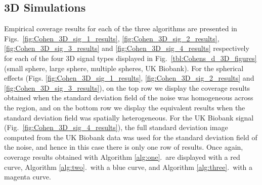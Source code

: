 \clearpage

\subsection{3D Simulations} 
\label{sec:3d_sim_results}
Empirical coverage results for each of the three algorithms are presented in Figs.\ \ref{fig:Cohen_3D_sig_1_results}, \ref{fig:Cohen_3D_sig_2_results}, \ref{fig:Cohen_3D_sig_3_results} and \ref{fig:Cohen_3D_sig_4_results} respectively for each of the four 3D signal types displayed in Fig.\ \ref{tbl:Cohens_d_3D_figures} (small sphere, large sphere, multiple spheres, UK Biobank). For the spherical effects (Figs. \ref{fig:Cohen_3D_sig_1_results}, \ref{fig:Cohen_3D_sig_2_results} and \ref{fig:Cohen_3D_sig_3_results}), on the top row we display the coverage results obtained when the standard deviation field of the noise was homogeneous across the region, and on the bottom row we display the equivalent results when the standard deviation field was spatially heterogeneous. For the UK Biobank signal (Fig.\ \ref{fig:Cohen_3D_sig_4_results}), the full standard deviation image computed from the UK Biobank data was used for the standard deviation field of the noise, and hence in this case there is only one row of results. Once again, coverage results obtained with Algorithm \ref{alg:one}.\ are displayed with a red curve, Algorithm \ref{alg:two}.\ with a blue curve, and Algorithm \ref{alg:three}.\ with a magenta curve.

